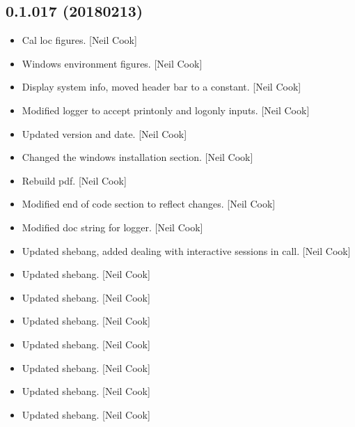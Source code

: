 \documentclass[a4paper,10pt,english]{report}
\begin{document}
\subsection{0.1.017 (2018\sphinxhyphen{}02\sphinxhyphen{}13)}
\label{\detokenize{misc/changelog:id505}}\begin{itemize}
\item {} 
Cal loc figures. {[}Neil Cook{]}

\item {} 
Windows environment figures. {[}Neil Cook{]}

\item {} 
Display system info, moved header bar to a constant. {[}Neil Cook{]}

\item {} 
Modified logger to accept printonly and logonly inputs. {[}Neil Cook{]}

\item {} 
Updated version and date. {[}Neil Cook{]}

\item {} 
Changed the windows installation section. {[}Neil Cook{]}

\item {} 
Rebuild pdf. {[}Neil Cook{]}

\item {} 
Modified end of code section to reflect changes. {[}Neil Cook{]}

\item {} 
Modified doc string for logger. {[}Neil Cook{]}

\item {} 
Updated shebang, added  dealing with interactive sessions
in  call. {[}Neil Cook{]}

\item {} 
Updated shebang. {[}Neil Cook{]}

\item {} 
Updated shebang. {[}Neil Cook{]}

\item {} 
Updated shebang. {[}Neil Cook{]}

\item {} 
Updated shebang. {[}Neil Cook{]}

\item {} 
Updated shebang. {[}Neil Cook{]}

\item {} 
Updated shebang. {[}Neil Cook{]}

\item {} 
Updated shebang. {[}Neil Cook{]}


\end{itemize}
\end{document}
